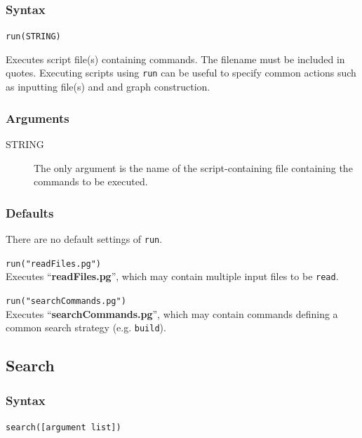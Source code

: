 	\subsubsection{Syntax}
		\texttt{run(STRING)}
		
	\begin{phygdescription}
		{Executes \phyg script file(s) containing commands. The filename must be 
		included in quotes. Executing scripts using \texttt{run} can be useful to specify 
		common actions such as inputting file(s) and and graph construction.}
	\end{phygdescription}
	
	\subsubsection{Arguments}
		\begin{description} 
		\item[STRING] The only argument is the name of the script-containing file
		 containing the commands to be executed.
		\end{description}
		
	\subsubsection{Defaults}
		There are no default settings of \texttt{run}. 
	
	\begin{example}
		\item{\texttt{run("readFiles.pg")}\\ Executes ``\textbf{readFiles.pg}'', which 
		may contain multiple input files to be \texttt{read}.}
		
		\item{\texttt{run("searchCommands.pg")}\\ Executes ``\textbf{searchCommands.pg}'', 
		which may contain commands defining a common search strategy (e.g. 
		\texttt{build}).}
	\end{example}

\subsection{Search}
\label{subsec:search}
	\subsubsection{Syntax}
		\texttt{search([argument list])}
	
